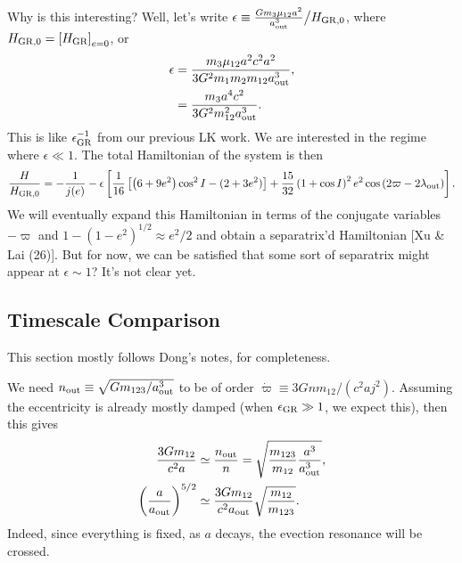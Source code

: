 \documentclass[11pt,
        usenames, %
        dvipsnames %
    ]{article}
\newcommand*{\p}[1]{\left(#1\right)}
\newcommand*{\s}[1]{\left[#1\right]}
\begin{document}
Why is this interesting? Well, let's write $\epsilon \equiv
\frac{Gm_3\mu_{12}a^2}{a_{\rm out}^3} \big/ H_{\rm GR, 0}$, where $H_{\rm GR, 0}
= \s{H_{\rm GR}}_{e = 0}$, or
\begin{align}
    \epsilon &= \frac{m_3\mu_{12}a^2 c^2a^2}{3G^2m_1m_2m_{12}a_{\rm out}^3},\\
        &= \frac{m_3a^4 c^2}{3G^2m_{12}^2a_{\rm out}^3}.
\end{align}
This is like $\epsilon_{\rm GR}^{-1}$ from our previous LK work. We are
interested in the regime where $\epsilon \ll 1$. The total Hamiltonian of the
system is then
\begin{equation}
    \frac{H}{H_{\rm GR, 0}} = -\frac{1}{j(e)}
        - \epsilon\s{
        \frac{1}{16}\s{\p{6 + 9e^2}\cos^2 I
            - (2 + 3e^2)} + \frac{15}{32}
                \p{1 + \cos I}^2 e^2 \cos\p{2\varpi - 2\lambda_{\rm out}}}.
\end{equation}
We will eventually expand this Hamiltonian in terms of the conjugate variables
$-\varpi$ and $1 - \p{1 - e^2}^{1/2} \approx e^2/2$ and obtain a separatrix'd
Hamiltonian [Xu \& Lai (26)]. But for now, we can be satisfied that some sort of
separatrix might appear at $\epsilon \sim 1$? It's not clear yet.

\subsection{Timescale Comparison}

This section mostly follows Dong's notes, for completeness.

We need $n_{\rm out} \equiv \sqrt{Gm_{123} / a_{\rm out}^3}$ to be of order
$\dot{\varpi} \equiv 3Gnm_{12} / (c^2aj^2)$. Assuming the eccentricity is
already mostly damped (when $\epsilon_{\rm GR} \gg 1$, we expect this), then
this gives
\begin{align}
    \frac{3Gm_{12}}{c^2a} &\simeq \frac{n_{\rm out}}{n}
        = \sqrt{\frac{m_{123}}{m_{12}}\frac{a^3}{a_{\rm out}^3}},\\
    \p{\frac{a}{a_{\rm out}}}^{5/2} &\simeq
        \frac{3Gm_{12}}{c^2a_{\rm out}}\sqrt{\frac{m_{12}}{m_{123}}}.
\end{align}
Indeed, since everything is fixed, as $a$ decays, the evection resonance will be
crossed.
\end{document}
